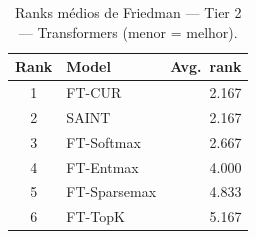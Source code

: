 \begin{table}[ht]
  \centering
  \caption{Ranks médios de Friedman — Tier 2 — Transformers (menor = melhor).}
  \label{tab:tier2_transformers_ranks}
  \begin{tabular}{clr}
    \toprule
    Rank & Model & Avg.\ rank \\
    \midrule
1 & FT-CUR & 2.167 \\
2 & SAINT & 2.167 \\
3 & FT-Softmax & 2.667 \\
4 & FT-Entmax & 4.000 \\
5 & FT-Sparsemax & 4.833 \\
6 & FT-TopK & 5.167 \\
    \bottomrule
  \end{tabular}
\end{table}